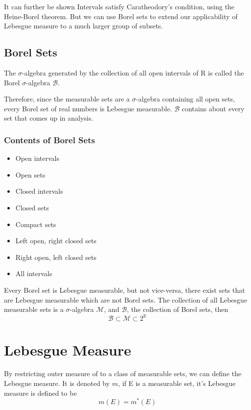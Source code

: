 \documentclass{article}
\begin{document}
It can further be shown Intervals satisfy Caratheodory's condition, using the Heine-Borel theorem. But we can use Borel sets to extend our applicability of Lebesgue measure to a much larger group of subsets.

\subsection{Borel Sets}
The $\sigma$-algebra generated by the collection of all open intervals of R is called the Borel $\sigma$-algebra $\mathscr{B}$.

Therefore, since the measurable sets are a $\sigma$-algebra containing all open sets, every Borel set of real numbers is Lebesgue measurable. $\mathscr{B}$ contains about every set that comes up in analysis.

\subsubsection{Contents of Borel Sets}
\begin{itemize}
    \item Open intervals
    \item Open sets
    \item Closed intervals
    \item Closed sets
    \item Compact sets
    \item Left open, right closed sets
    \item Right open, left closed sets
    \item All intervals
\end{itemize}

Every Borel set is Lebesgue measurable, but not vice-versa, there exist sets that are Lebesgue measurable which are not Borel sets.
The collection of all Lebesgue measurable sets is a $\sigma$-algebra $\mathscr{M}$, and $\mathscr{B}$, the collection of Borel sets, then
$$\mathscr{B} \subset \mathscr{M} \subset 2^{\mathbb{R}} $$

\section{Lebesgue Measure}

By restricting outer measure of to a class of measurable sets, we can define the Lebesgue measure. It is denoted by $m$, if E is a measurable set, it's Lebesgue measure is defined to be
$$m(E)=m^*(E)$$
\end{document}

